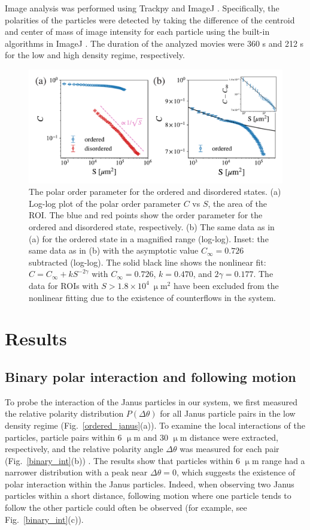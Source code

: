 \documentclass[%
 reprint,
 amsmath,amssymb,
 aps,
 floatfix
]{revtex4-2}
\begin{document}
Image analysis was performed using Trackpy \cite{trackpy} and ImageJ \cite{imagej}.
Specifically, the polarities of the particles were detected by taking the difference of the centroid and center of mass of image intensity for each particle using the built-in algorithms in ImageJ \cite{supplement}.
The duration of the analyzed movies were 360 s and 212 s for the low and high density regime, respectively.

\begin{figure}[tb]
\includegraphics[width=\columnwidth]{order_parameter-2.pdf}
\caption{\label{order_param} The polar order parameter for the ordered and disordered states. (a) Log-log plot of the polar order parameter $C$ vs $S$, the area of the ROI. The blue and red points show the order parameter for the ordered and disordered state, respectively. 
(b) The same data as in (a) for the ordered state in a magnified range (log-log). 
Inset: the same data as in (b) with the asymptotic value $C_\infty = 0.726$ subtracted (log-log).
The solid black line shows the nonlinear fit: $C = C_\infty + k S^{-2\gamma}$ with $C_\infty = 0.726$, $k = 0.470$, and $2\gamma = 0.177$. The data for ROIs with $ S>1.8\times10^{4}\ \upmu$m$^2$ have been excluded from the nonlinear fitting due to the existence of counterflows in the system.}
\end{figure}


\section{Results}
\subsection{Binary polar interaction and following motion}
To probe the interaction of the Janus particles in our system, we first measured the relative polarity distribution $P\left(\Delta\theta\right)$ for all Janus particle pairs in the low density regime (Fig.~\ref{ordered_janus}(a)). 
To examine the local interactions of the particles, particle pairs within 6 $\upmu$m and 30 $\upmu$m distance were extracted, respectively, and the relative polarity angle $\Delta\theta$ was measured for each pair (Fig.~\ref{binary_int}(b)) \cite{supplement}. 
The results show that particles within 6 $\upmu$m range had a narrower distribution with a peak near $\Delta\theta=0$, which suggests the existence of polar interaction within the Janus particles.
Indeed, when observing two Janus particles within a short distance, following motion where one particle tends to follow the other particle could often be observed (for example, see Fig.~\ref{binary_int}(c)). 
\end{document}
